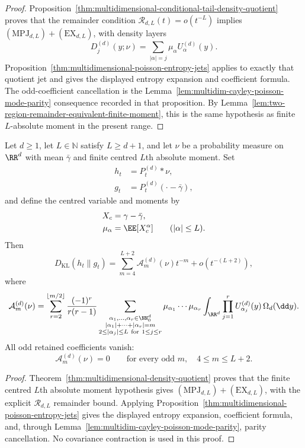 \begin{proof}
Proposition~\ref{thm:multidimensional-conditional-tail-density-quotient} proves
that the remainder condition \(\mathcal R_{d,L}(t)=o(t^{-L})\) implies
\((\mathrm{MPJ}_{d,L})+(\mathrm{EX}_{d,L})\), with density layers
\[
D_j^{(d)}(y;\nu)=\sum_{|\alpha|=j}\mu_\alpha U_\alpha^{(d)}(y).
\]
Proposition~\ref{thm:multidimensional-poisson-entropy-jets} applies to
exactly that quotient jet and gives the displayed entropy expansion and
coefficient formula.  The odd-coefficient cancellation is the
Lemma~\ref{lem:multidim-cayley-poisson-mode-parity} consequence recorded in
that proposition.  By
Lemma~\ref{lem:two-region-remainder-equivalent-finite-moment}, this is the
same hypothesis as finite \(L\)-absolute moment in the present range.
\end{proof}

\begin{corollary}%
\label{thm:multidim-finite-moment-poisson-kl-asymptotic}%
\label{cor:multidim-finite-moment-entropy-jet}
Let \(d\ge1\), let \(L\in\mathbb N\) satisfy \(L\ge d+1\), and let \(\nu\) be
a probability measure on \(\RR^d\) with mean \(\bar{\gamma}\) and finite centred
\(L\)th absolute moment.  Set
\[
\begin{aligned}
h_t&=P_t^{(d)}*\nu,\\
g_t&=P_t^{(d)}(\cdot-\bar{\gamma}),
\end{aligned}
\]
and define the centred variable and moments by
\[
\begin{aligned}
X_c&=\gamma-\bar{\gamma},\\
\mu_\alpha&=\EE[X_c^\alpha]\qquad(|\alpha|\le L).
\end{aligned}
\]
Then
\[
D_{\mathrm{KL}}(h_t\|g_t)
=\sum_{m=4}^{L+2}\mathcal A_m^{(d)}(\nu)t^{-m}
+o(t^{-(L+2)}),
\]
where
\[
\mathcal A_m^{(d)}(\nu)=
\sum_{r=2}^{\lfloor m/2\rfloor}
\frac{(-1)^r}{r(r-1)}
\sum_{\substack{\alpha_1,\ldots,\alpha_r\in\NN_0^d\\
|\alpha_1|+\cdots+|\alpha_r|=m\\
2\le|\alpha_j|\le L\ \mathrm{for}\ 1\le j\le r}}
\mu_{\alpha_1}\cdots\mu_{\alpha_r}
\int_{\RR^d}\prod_{j=1}^r
U_{\alpha_j}^{(d)}(y)\,\Omega_d(\dd y).
\]
All odd retained coefficients vanish:
\[
\mathcal A_m^{(d)}(\nu)=0
\qquad\text{for every odd }m,\quad 4\le m\le L+2.
\]
\end{corollary}

\begin{proof}
Theorem~\ref{thm:multidimensional-density-quotient} proves that the finite
centred \(L\)th absolute moment hypothesis gives
\((\mathrm{MPJ}_{d,L})+(\mathrm{EX}_{d,L})\), with the explicit
\(\mathcal R_{d,L}\) remainder bound.  Applying
Proposition~\ref{thm:multidimensional-poisson-entropy-jets} gives the
displayed entropy expansion, coefficient formula, and, through
Lemma~\ref{lem:multidim-cayley-poisson-mode-parity}, parity cancellation.
No covariance contraction is used in this proof.
\end{proof}

